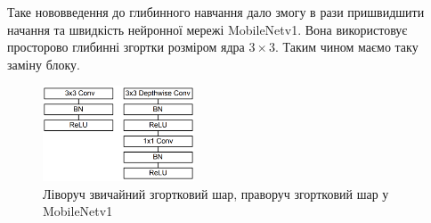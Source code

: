Таке нововведення до глибинного навчання дало змогу в рази пришвидшити 
начання та швидкість нейронної мережі MobileNetv1. Вона використовує 
просторово глибинні згортки розміром ядра $3 \times 3$. 
Таким чином маємо таку заміну блоку.

\begin{figure}[H]
    \centering
    \includegraphics[width=0.4\textwidth]{images/cnn_mobilenetv1_conv_layer}
    \caption{Ліворуч звичайний згортковий шар, праворуч згортковий шар у MobileNetv1
    \label{fig:cnn:mobilenetv1_conv_layer}
    }
\end{figure}
